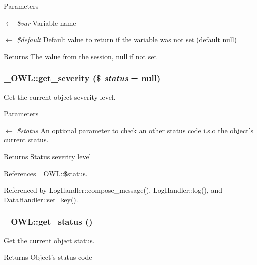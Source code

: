 \begin{DoxyParams}{Parameters}
\item[\mbox{$\leftarrow$} {\em \$var}]Variable name \item[\mbox{$\leftarrow$} {\em \$default}]Default value to return if the variable was not set (default null) \end{DoxyParams}
\begin{DoxyReturn}{Returns}
The value from the session, null if not set 
\end{DoxyReturn}
\subsubsection[{get\_\-severity}]{\setlength{\rightskip}{0pt plus 5cm}\_\-OWL::get\_\-severity (\$ {\em status} = {\ttfamily null})}\label{class__OWL_adf9509ef96858be7bdd9414c5ef129aa}
Get the current object severity level.


\begin{DoxyParams}{Parameters}
\item[\mbox{$\leftarrow$} {\em \$status}]An optional parameter to check an other status code i.s.o the object's current status. \end{DoxyParams}
\begin{DoxyReturn}{Returns}
Status severity level 
\end{DoxyReturn}


References \_\-OWL::\$status.



Referenced by LogHandler::compose\_\-message(), LogHandler::log(), and DataHandler::set\_\-key().

\subsubsection[{get\_\-status}]{\setlength{\rightskip}{0pt plus 5cm}\_\-OWL::get\_\-status ()}\label{class__OWL_a99ec771fa2c5c279f80152cc09e489a8}
Get the current object status.

\begin{DoxyReturn}{Returns}
Object's status code 
\end{DoxyReturn}


